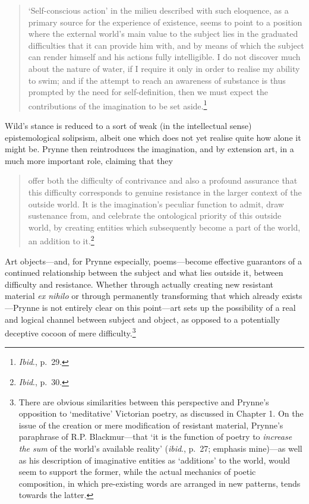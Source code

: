 \documentclass[]{article}
\begin{document}
\begin{quote}
\singlespacing ‘Self-conscious action’ in the milieu described with such
eloquence, as a primary source for the experience of existence, seems to
point to a position where the external world’s main value to the subject
lies in the graduated difficulties that it can provide him with, and by
means of which the subject can render himself and his actions fully
intelligible. I do not discover much about the nature of water, if I
require it only in order to realise my ability to swim; and if the
attempt to reach an awareness of substance is thus prompted by the need
for self-definition, then we must expect the contributions of the
imagination to be set aside.\footnote{\emph{Ibid}., p.~29.}
\end{quote}

\noindent Wild’s stance is reduced to a sort of weak (in the
intellectual sense) epistemological solipsism, albeit one which does not
yet realise quite how alone it might be. Prynne then reintroduces the
imagination, and by extension art, in a much more important role,
claiming that they

\begin{quote}
\singlespacing offer both the difficulty of contrivance and also a
profound assurance that this difficulty corresponds to genuine
resistance in the larger context of the outside world. It is the
imagination’s peculiar function to admit, draw sustenance from, and
celebrate the ontological priority of this outside world, by creating
entities which subsequently become a part of the world, an addition to
it.\footnote{\emph{Ibid}., p.~30.}
\end{quote}

\noindent Art objects—and, for Prynne especially, poems—become effective
guarantors of a continued relationship between the subject and what lies
outside it, between difficulty and resistance. Whether through actually
creating new resistant material \emph{ex nihilo} or through permanently
transforming that which already exists—Prynne is not entirely clear on
this point—art sets up the possibility of a real and logical channel
between subject and object, as opposed to a potentially deceptive cocoon
of mere difficulty.\footnote{There are obvious similarities between this
  perspective and Prynne’s opposition to ‘meditative’ Victorian poetry,
  as discussed in Chapter 1. On the issue of the creation or mere
  modification of resistant material, Prynne’s paraphrase of R.P.
  Blackmur—that ‘it is the function of poetry to \emph{increase the sum}
  of the world’s available reality’ (\emph{ibid}., p.~27; emphasis
  mine)—as well as his description of imaginative entities as
  ‘additions’ to the world, would seem to support the former, while the
  actual mechanics of poetic composition, in which pre-existing words
  are arranged in new patterns, tends towards the latter.}
\end{document}
